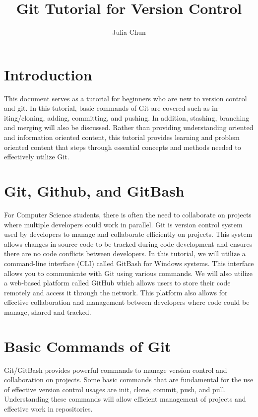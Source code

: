 \documentclass[10pt,twocolumn]{article}
\title{Git Tutorial for Version Control}
\author{Julia Chun}
\affiliation{Occidental College}
\begin{document}
\maketitle

\section{Introduction}

This document serves as a tutorial for beginners who are new to version control and git. In this tutorial, basic commands of Git are covered such as in-iting/cloning, adding, committing, and pushing. In addition, stashing, branching and merging will also be discussed. Rather than providing understanding oriented and information oriented content, this tutorial provides learning and problem oriented content that steps through essential concepts and methods needed to effectively utilize Git.  

\section{Git, Github, and GitBash}
For Computer Science students, there is often the need to collaborate on projects where multiple developers could work in parallel. Git is  version control system used by developers to manage and collaborate efficiently on projects. This system allows changes in source code to be tracked during code development and ensures there are no code conflicts between developers. In this tutorial, we will utilize a command-line interface (CLI) called GitBash for Windows systems. This interface allows you to communicate with Git using various commands. We will also utilize a web-based platform called GitHub which allows users to store their code remotely and access it through the network. This platform also allows for effective collaboration and management between developers where code could be manage, shared and tracked. 


\section {Basic Commands of Git}
Git/GitBash provides powerful commands to manage version control and collaboration on projects. Some basic commands that are fundamental for the use of effective version control usages are init, clone, commit, push, and pull. Understanding these commands will allow efficient management of projects and effective work in repositories. 
\end{document}
